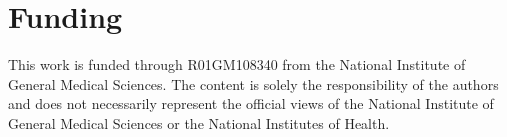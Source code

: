 \section{Funding}
This work is funded through R01GM108340 from the National Institute of General Medical Sciences. The content is solely the responsibility of the authors and does not necessarily represent the official views of the National Institute of General Medical Sciences or the National Institutes of Health.